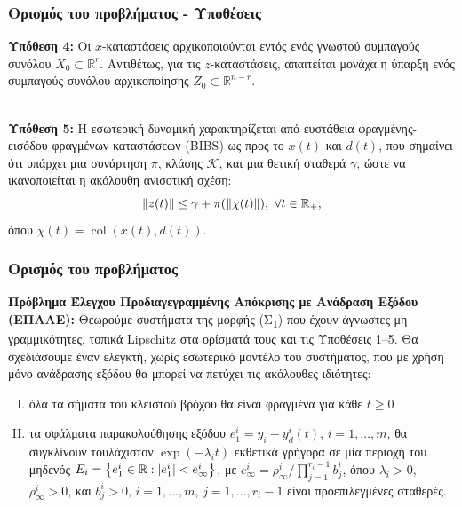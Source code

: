 \documentclass{beamer}
\DeclareMathOperator{\col}{col}
\newcommand{\R}{\mathbb{R}}
\begin{document}
    \begin{frame}
        \frametitle{Ορισμός του προβλήματος - Υποθέσεις}
    
        \textbf{Υπόθεση 4:} Οι $x$-καταστάσεις αρχικοποιούνται εντός ενός γνωστού συμπαγούς συνόλου $X_0 \subset \R^r$. Αντιθέτως, για τις $z$-καταστάσεις, απαιτείται μονάχα η ύπαρξη ενός συμπαγούς συνόλου αρχικοποίησης $Z_0 \subset \R^{n-r}$.\\~\
        
        \textbf{Υπόθεση 5:} Η εσωτερική δυναμική χαρακτηρίζεται από ευστάθεια φραγμένης-εισόδου-φραγμένων-καταστάσεων (\textlatin{BIBS}) ως προς το $x(t)$ και $d(t)$, που σημαίνει ότι υπάρχει μια συνάρτηση $\pi$, κλάσης $\mathcal{K}$, και μια θετική σταθερά $\gamma$, ώστε να ικανοποιείται η ακόλουθη ανισοτική σχέση:
        \begin{equation*}
        \label{eq:bibs}                
        \norm{z(t)} \leq \gamma + \pi\pqty{\norm{\chi(t)}},\ \forall t \in \R_+,
        \end{equation*}
        όπου $\chi(t) = \col(x(t), d(t))$.
    \end{frame}

    \begin{frame}
        \frametitle{Ορισμός του προβλήματος}
    
        \textbf{Πρόβλημα Έλεγχου Προδιαγεγραμμένης Απόκρισης με Ανάδραση Εξόδου (ΕΠΑΑΕ):} Θεωρούμε συστήματα της μορφής (Σ\textsubscript{1}) που έχουν άγνωστες μη-γραμμικότητες, τοπικά \textlatin{Lipschitz} στα ορίσματά τους και τις Υποθέσεις 1--5. Θα σχεδιάσουμε έναν ελεγκτή, χωρίς εσωτερικό μοντέλο του συστήματος, που με χρήση μόνο ανάδρασης εξόδου θα μπορεί να πετύχει τις ακόλουθες ιδιότητες: 
        \begin{enumerate}[I.]%
            \pause
            \item όλα τα σήματα του κλειστού βρόχου θα είναι φραγμένα για κάθε $t \geq 0$ 
            \pause
            \item τα σφάλματα παρακολούθησης εξόδου $e_1^i = y_i - y_d^i(t)$, $i = 1,\ldots, m$, θα συγκλίνουν τουλάχιστον $\exp(-\lambda_i t)$ εκθετικά γρήγορα σε μία περιοχή του μηδενός $E_i = \qty{e_1^i \in \R: |e_1^i| < e^i_\infty}$, με $e_\infty^i = \rho^i_\infty/\prod_{j=1}^{r_i - 1} b_j^i$,  όπου $\lambda_i >0$, $\rho_\infty^i >0$, και $b_j^i>0$, $i = 1,\ldots, m$, $j = 1, \ldots, r_i - 1$ είναι προεπιλεγμένες σταθερές.
        \end{enumerate}
    \end{frame}
   
\end{document}
